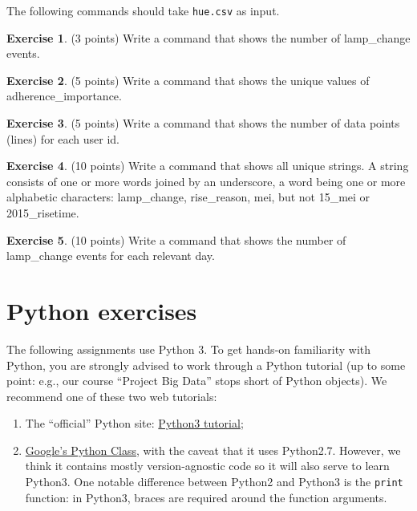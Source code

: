 \documentclass[a4paper]{report}
\theoremstyle{definition}
\newtheorem{exercise}{Exercise}
\begin{document}
\noindent The following commands should take \texttt{hue.csv} as input.

\begin{exercise}
	(3 points) Write a command that shows the number of lamp\_change events.
\end{exercise}

\begin{exercise}
	(5 points) Write a command that shows the unique values of adherence\_importance.
\end{exercise}

\begin{exercise}
	(5 points) Write a command that shows the number of data points (lines) for each
	user id.
\end{exercise}

\begin{exercise}
	(10 points) Write a command that shows all unique strings. A string consists of one or more words joined by an underscore, a word being
	one or more alphabetic characters: lamp\_change, rise\_reason, mei, but not 15\_mei or 2015\_risetime.
\end{exercise}

\begin{exercise}
	(10 points) Write a command that shows the number of lamp\_change events for each relevant day.
\end{exercise}


\section*{Python exercises}
\label{python-exercises}
The following assignments use Python 3. To get hands-on familiarity with
Python, you are strongly advised to work through a Python tutorial (up to
some point: e.g., our course ``Project Big Data'' stops short of Python objects). We recommend one of these two web tutorials:
\begin{enumerate}
	\setlength\itemsep{1mm}
	\item The ``official'' Python site: \href{https://docs.python.org/3/tutorial}{Python3 tutorial};
	\item \href{https://developers.google.com/edu/python/}{Google's Python Class}, with the caveat that it uses Python2.7. However, we think it contains	mostly version-agnostic code so it will also serve to learn Python3.
	One notable difference between Python2 and Python3 is the
	{\small\texttt{print}} function: in Python3, braces are required around
	the function arguments.
\end{enumerate}
\end{document}
